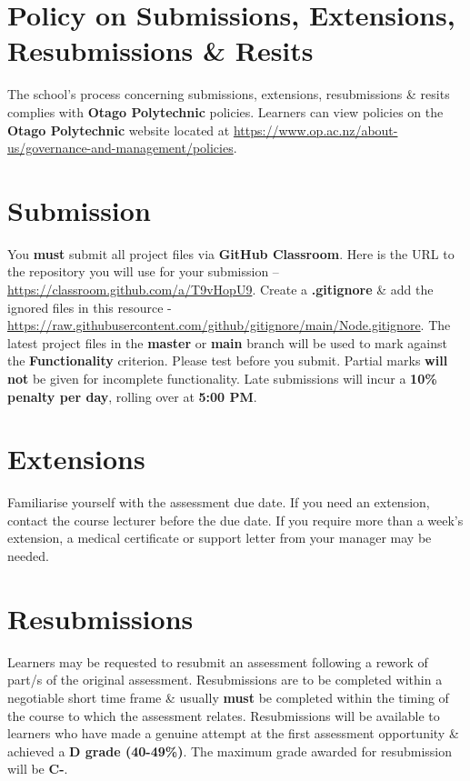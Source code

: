 \documentclass{article}
\begin{document}
\section*{Policy on Submissions, Extensions, Resubmissions \& Resits}
The school's process concerning submissions, extensions, resubmissions \& resits complies with \textbf{Otago Polytechnic} policies. Learners can view policies on the \textbf{Otago Polytechnic} website located at \href{https://www.op.ac.nz/about-us/governance-and-management/policies}{https://www.op.ac.nz/about-us/governance-and-management/policies}.

\section*{Submission}
You \textbf{must} submit all project files via \textbf{GitHub Classroom}. Here is the URL to the repository you will use for your submission – \href{https://classroom.github.com/a/T9vHopU9}{https://classroom.github.com/a/T9vHopU9}.  Create a \textbf{.gitignore} \& add the ignored files in this resource - \href{https://raw.githubusercontent.com/github/gitignore/main/Node.gitignore}{https://raw.githubusercontent.com/github/gitignore/main/Node.gitignore}. The latest project files in the \textbf{master} or \textbf{main} branch will be used to mark against the \textbf{Functionality} criterion. Please test before you submit. Partial marks \textbf{will not} be given for incomplete functionality. Late submissions will incur a \textbf{10\% penalty per day}, rolling over at \textbf{5:00 PM}.

\section*{Extensions}
Familiarise yourself with the assessment due date. If you need an extension, contact the course lecturer before the due date. If you require more than a week's extension, a medical certificate or support letter from your manager may be needed.

\section*{Resubmissions}
Learners may be requested to resubmit an assessment following a rework of part/s of the original assessment. Resubmissions are to be completed within a negotiable short time frame \& usually \textbf{must} be completed within the timing of the course to which the assessment relates. Resubmissions will be available to learners who have made a genuine attempt at the first assessment opportunity \& achieved a \textbf{D grade (40-49\%)}. The maximum grade awarded for resubmission will be \textbf{C-}.
\end{document}
